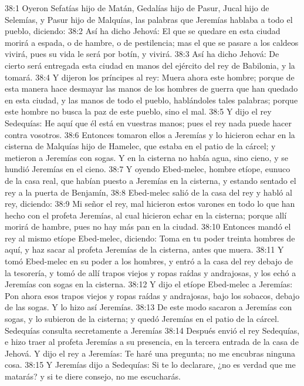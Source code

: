 38:1 Oyeron Sefatías hijo de Matán, Gedalías hijo de Pasur, Jucal hijo de Selemías, y Pasur hijo de Malquías, las palabras que Jeremías hablaba a todo el pueblo, diciendo: 
38:2 Así ha dicho Jehová: El que se quedare en esta ciudad morirá a espada, o de hambre, o de pestilencia; mas el que se pasare a los caldeos vivirá, pues su vida le será por botín, y vivirá. 
38:3 Así ha dicho Jehová: De cierto será entregada esta ciudad en manos del ejército del rey de Babilonia, y la tomará. 
38:4 Y dijeron los príncipes al rey: Muera ahora este hombre; porque de esta manera hace desmayar las manos de los hombres de guerra que han quedado en esta ciudad, y las manos de todo el pueblo, hablándoles tales palabras; porque este hombre no busca la paz de este pueblo, sino el mal. 
38:5 Y dijo el rey Sedequías: He aquí que él está en vuestras manos; pues el rey nada puede hacer contra vosotros. 
38:6 Entonces tomaron ellos a Jeremías y lo hicieron echar en la cisterna de Malquías hijo de Hamelec, que estaba en el patio de la cárcel; y metieron a Jeremías con sogas. Y en la cisterna no había agua, sino cieno, y se hundió Jeremías en el cieno. 
38:7 Y oyendo Ebed-melec, hombre etíope, eunuco de la casa real, que habían puesto a Jeremías en la cisterna, y estando sentado el rey a la puerta de Benjamín, 
38:8 Ebed-melec salió de la casa del rey y habló al rey, diciendo: 
38:9 Mi señor el rey, mal hicieron estos varones en todo lo que han hecho con el profeta Jeremías, al cual hicieron echar en la cisterna; porque allí morirá de hambre, pues no hay más pan en la ciudad. 
38:10 Entonces mandó el rey al mismo etíope Ebed-melec, diciendo: Toma en tu poder treinta hombres de aquí, y haz sacar al profeta Jeremías de la cisterna, antes que muera. 
38:11 Y tomó Ebed-melec en su poder a los hombres, y entró a la casa del rey debajo de la tesorería, y tomó de allí trapos viejos y ropas raídas y andrajosas, y los echó a Jeremías con sogas en la cisterna. 
38:12 Y dijo el etíope Ebed-melec a Jeremías: Pon ahora esos trapos viejos y ropas raídas y andrajosas, bajo los sobacos, debajo de las sogas. Y lo hizo así Jeremías. 
38:13 De este modo sacaron a Jeremías con sogas, y lo subieron de la cisterna; y quedó Jeremías en el patio de la cárcel. 
Sedequías consulta secretamente a Jeremías 
38:14 Después envió el rey Sedequías, e hizo traer al profeta Jeremías a su presencia, en la tercera entrada de la casa de Jehová. Y dijo el rey a Jeremías: Te haré una pregunta; no me encubras ninguna cosa. 
38:15 Y Jeremías dijo a Sedequías: Si te lo declarare, ¿no es verdad que me matarás? y si te diere consejo, no me escucharás. 

